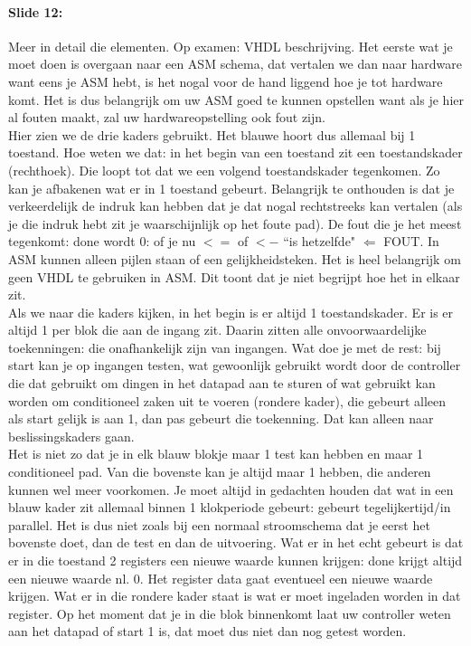 \documentclass[10pt,a4paper]{book}
\begin{document}
\paragraph{Slide 12:} Meer in detail die elementen. Op examen: VHDL beschrijving. Het eerste wat je moet doen is overgaan naar een ASM schema, dat vertalen we dan naar hardware want eens je ASM hebt, is het nogal voor de hand liggend hoe je tot hardware komt. Het is dus belangrijk om uw ASM goed te kunnen opstellen want als je hier al fouten maakt, zal uw hardwareopstelling ook fout zijn.\\
Hier zien we de drie kaders gebruikt. Het blauwe hoort dus allemaal bij 1 toestand. Hoe weten we dat: in het begin van een toestand zit een toestandskader (rechthoek). Die loopt tot dat we een volgend toestandskader tegenkomen. Zo kan je afbakenen wat er in 1 toestand gebeurt. Belangrijk te onthouden is dat je verkeerdelijk de indruk kan hebben dat je dat nogal rechtstreeks kan vertalen (als je die indruk hebt zit je waarschijnlijk op het foute pad). De fout die je het meest tegenkomt: done wordt 0: of je nu $<=$ of $<-$ ``is hetzelfde" $\Leftarrow$ FOUT. In ASM kunnen alleen pijlen staan of een gelijkheidsteken. Het is heel belangrijk om geen VHDL te gebruiken in ASM. Dit toont dat je niet begrijpt hoe het in elkaar zit.\\
Als we naar die kaders kijken, in het begin is er altijd 1 toestandskader. Er is er altijd 1 per blok die aan de ingang zit. Daarin zitten alle onvoorwaardelijke toekenningen: die onafhankelijk zijn van ingangen. Wat doe je met de rest: bij start kan je op ingangen testen, wat gewoonlijk gebruikt wordt door de controller die dat gebruikt om dingen in het datapad aan te sturen of wat gebruikt kan worden om conditioneel zaken uit te voeren (rondere kader), die gebeurt alleen als start gelijk is aan 1, dan pas gebeurt die toekenning. Dat kan alleen naar beslissingskaders gaan.\\
Het is niet zo dat je in elk blauw blokje maar 1 test kan hebben en maar 1 conditioneel pad. Van die bovenste kan je altijd maar 1 hebben, die anderen kunnen wel meer voorkomen. Je moet altijd in gedachten houden dat wat in een blauw kader zit allemaal binnen 1 klokperiode gebeurt: gebeurt tegelijkertijd/in parallel. Het is dus niet zoals bij een normaal stroomschema dat je eerst het bovenste doet, dan de test en dan de uitvoering. Wat er in het echt gebeurt is dat er in die toestand 2 registers een nieuwe waarde kunnen krijgen: done krijgt altijd een nieuwe waarde nl. 0. Het register data gaat eventueel een nieuwe waarde krijgen. Wat er in die rondere kader staat is wat er moet ingeladen worden in dat register. Op het moment dat je in die blok binnenkomt laat uw controller weten aan het datapad of start 1 is, dat moet dus niet dan nog getest worden.\\
\end{document}
